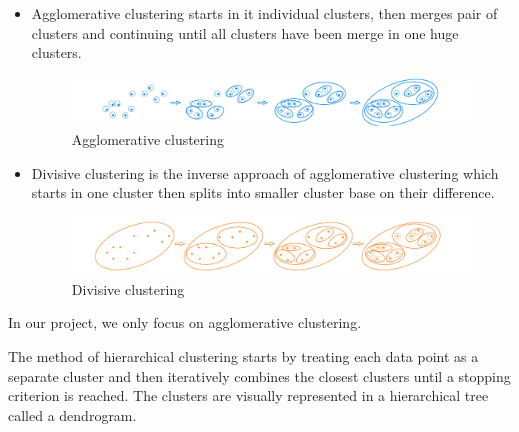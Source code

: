 \begin{itemize}
    \item Agglomerative clustering starts in it individual clusters, then merges pair of clusters and continuing until all clusters have been merge in one huge clusters.

        \begin{figure}[H]
            \centering
            \includegraphics[scale=0.4]{graphics/overview/Agglomerative.png}
            \caption{Agglomerative clustering}
        \end{figure}

    \item Divisive clustering is the inverse approach of agglomerative clustering which starts in one cluster then splits into smaller cluster base on their difference.

        \begin{figure}[H]
            \centering
            \includegraphics[scale=0.4]{graphics/overview/Diversive.png}
            \caption{Divisive clustering}
        \end{figure}
\end{itemize}
In our project, we only focus on agglomerative clustering.




The method of hierarchical clustering starts by treating each data point as a separate cluster and then iteratively combines the closest clusters until a stopping criterion is reached. The clusters are visually represented in a hierarchical tree called a dendrogram. 

